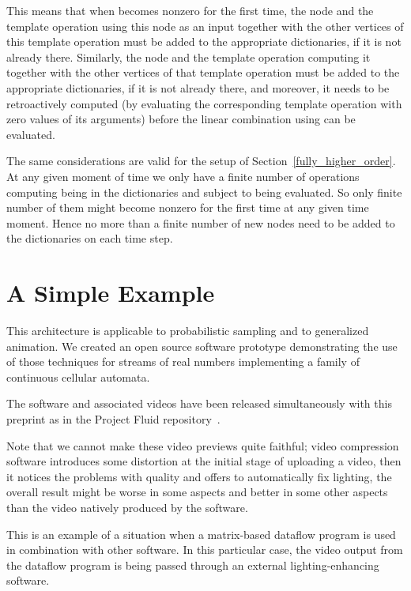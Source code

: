 \documentclass[withtimes]{easychair}
\begin{document}
This means that when  becomes nonzero for the first time,
the  node and the template operation using this node as an input together with the other vertices
of this template operation must be added to the appropriate dictionaries, if it is not already there.
Similarly, the  node and the template operation computing it together with the other vertices
of that template operation must be added to the appropriate dictionaries, if it is not already there,
and moreover, it needs to be retroactively computed (by evaluating the corresponding template operation
with zero values of its arguments) 
before the linear combination using   can be evaluated.

The same considerations are valid for the setup of Section~\ref{fully_higher_order}. At any given moment
of time we only have a finite number of operations computing  being in the dictionaries and subject to being
evaluated. So only finite number of them might become nonzero for the first time at any given time moment.
Hence no more than a finite number of new nodes need to be added to the dictionaries on
each time step.



\section{A Simple Example}\label{simple_example}

This architecture is applicable to probabilistic sampling and to generalized animation.
We created an open source software prototype demonstrating the use
of those techniques for streams of real numbers implementing a family
of continuous cellular automata.

The software and associated videos have been released simultaneously with this
preprint as in the Project Fluid repository~\cite{Fluid}.

Note that we cannot make these video previews quite faithful; 
video compression software introduces some distortion at the initial stage of uploading a video,
then it notices the problems with quality and offers to automatically fix lighting,
the overall result might be worse in some aspects and better in some other aspects
than the video natively produced by the software.

This is an example of a situation when a matrix-based dataflow program is used
in combination with other software. In this particular case, the video output
from the dataflow program is being passed through an external
lighting-enhancing software.
\end{document}
